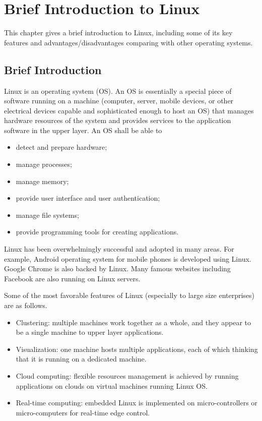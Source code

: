 \chapter{Brief Introduction to Linux}

This chapter gives a brief introduction to Linux, including some of its key features and advantages/disadvantages comparing with other operating systems.

\section{Brief Introduction}

Linux is an operating system (OS). An OS is essentially a special piece of software running on a machine (computer, server, mobile devices, or other electrical devices capable and sophisticated enough to host an OS) that manages hardware resources of the system and provides services to the application software in the upper layer. An OS shall be able to
\begin{itemize}
  \item detect and prepare hardware;
  \item manage processes;
  \item manage memory;
  \item provide user interface and user authentication;
  \item manage file systems;
  \item provide programming tools for creating applications.
\end{itemize}

Linux has been overwhelmingly successful and adopted in many areas. For example, Android operating system for mobile phones is developed using Linux. Google Chrome is also backed by Linux. Many famous websites including Facebook are also running on Linux servers.

Some of the most favorable features of Linux (especially to large size enterprises) are as follows.
\begin{itemize}
  \item Clustering: multiple machines work together as a whole, and they appear to be a single machine to upper layer applications.
  \item Visualization: one machine hosts multiple applications, each of which thinking that it is running on a dedicated machine.
  \item Cloud computing: flexible resources management is achieved by running applications on clouds on virtual machines running Linux OS.
  \item Real-time computing: embedded Linux is implemented on micro-controllers or micro-computers for real-time edge control.
\end{itemize}

